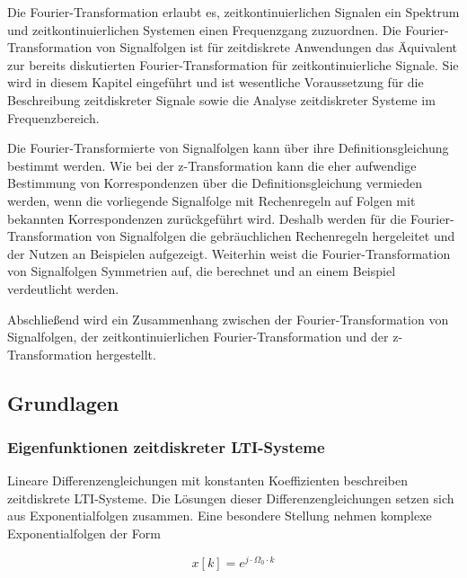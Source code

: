 \noindent Die Fourier-Transformation erlaubt es, zeitkontinuierlichen Signalen ein Spektrum und zeitkontinuierlichen Systemen einen Frequenzgang zuzuordnen. Die Fourier-Transformation von Signalfolgen ist f\"{u}r zeitdiskrete Anwendungen das \"{A}quivalent zur bereits diskutierten Fourier-Transformation f\"{u}r zeitkontinuierliche Signale. Sie wird in diesem Kapitel eingef\"{u}hrt und ist wesentliche Voraussetzung f\"{u}r die Beschreibung zeitdiskreter Signale sowie die Analyse zeitdiskreter Systeme im Frequenzbereich.\newline

\noindent Die Fourier-Transformierte von Signalfolgen kann \"{u}ber ihre Definitionsgleichung bestimmt werden. Wie bei der z-Transformation kann die eher aufwendige Bestimmung von Korrespondenzen \"{u}ber die Definitionsgleichung vermieden werden, wenn die vorliegende Signalfolge mit Rechenregeln auf Folgen mit bekannten Korrespondenzen zur\"{u}ckgef\"{u}hrt wird. Deshalb werden f\"{u}r die Fourier-Transformation von Signalfolgen die gebr\"{a}uchlichen Rechenregeln hergeleitet und der Nutzen an Beispielen aufgezeigt. Weiterhin weist die Fourier-Transformation von Signalfolgen Symmetrien auf, die berechnet und an einem Beispiel verdeutlicht werden.\newline

\noindent Abschlie{\ss}end wird ein Zusammenhang zwischen der Fourier-Transformation von Signalfolgen, der zeitkontinuierlichen Fourier-Transformation und der z-Transformation hergestellt. 

\subsection{Grundlagen}

\subsubsection{Eigenfunktionen zeitdiskreter LTI-Systeme}

\noindent Lineare Differenzengleichungen mit konstanten Koeffizienten beschreiben zeitdiskrete LTI-Systeme. Die L\"{o}sungen dieser Differenzengleichungen setzen sich aus Exponentialfolgen zusammen. Eine besondere Stellung nehmen komplexe Exponentialfolgen der Form 

\begin{equation}\label{eq:sevenone}
x\left[k\right]=e^{j\cdot \Omega _{0} \cdot k}
\end{equation}

